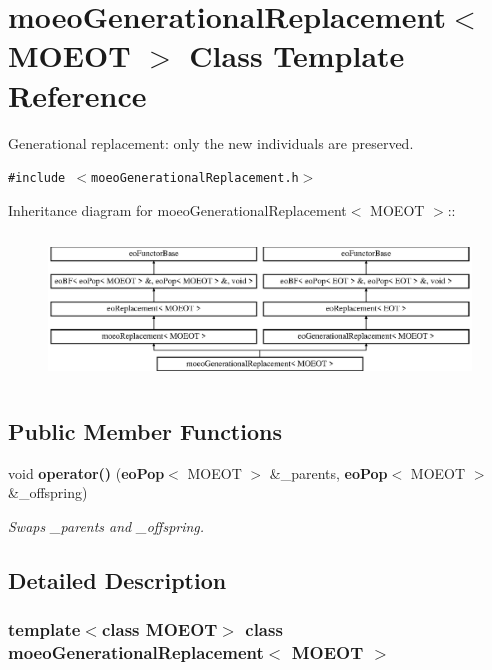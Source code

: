 \section{moeo\-Generational\-Replacement$<$ MOEOT $>$ Class Template Reference}
\label{classmoeoGenerationalReplacement}
Generational replacement: only the new individuals are preserved.  


{\tt \#include $<$moeo\-Generational\-Replacement.h$>$}

Inheritance diagram for moeo\-Generational\-Replacement$<$ MOEOT $>$::\begin{figure}[H]
\begin{center}
\leavevmode
\includegraphics[height=3.93258cm]{classmoeoGenerationalReplacement}
\end{center}
\end{figure}
\subsection*{Public Member Functions}
\begin{CompactItemize}
\item 
void {\bf operator()} ({\bf eo\-Pop}$<$ MOEOT $>$ \&\_\-parents, {\bf eo\-Pop}$<$ MOEOT $>$ \&\_\-offspring)
\begin{CompactList}\small\item\em Swaps \_\-parents and \_\-offspring. \item\end{CompactList}\end{CompactItemize}


\subsection{Detailed Description}
\subsubsection*{template$<$class MOEOT$>$ class moeo\-Generational\-Replacement$<$ MOEOT $>$}

